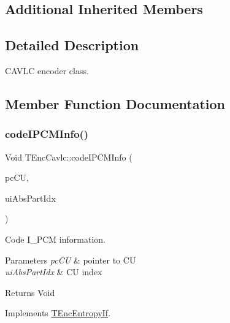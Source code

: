 \subsection*{Additional Inherited Members}


\subsection{Detailed Description}
C\+A\+V\+LC encoder class. 

\subsection{Member Function Documentation}
\mbox{\label{class_t_enc_cavlc_a9e19f3ef8ce0af73f4c0edb681818db0}} 
\subsubsection{\texorpdfstring{code\+I\+P\+C\+M\+Info()}{codeIPCMInfo()}}
{\footnotesize\ttfamily Void T\+Enc\+Cavlc\+::code\+I\+P\+C\+M\+Info (\begin{DoxyParamCaption}\item[{\hyperlink{class_t_com_data_c_u}{T\+Com\+Data\+CU} $\ast$}]{pc\+CU,  }\item[{U\+Int}]{ui\+Abs\+Part\+Idx }\end{DoxyParamCaption})\hspace{0.3cm}{\ttfamily [virtual]}}

Code I\+\_\+\+P\+CM information. 
\begin{DoxyParams}{Parameters}
{\em pc\+CU} & pointer to CU \\
\hline
{\em ui\+Abs\+Part\+Idx} & CU index \\
\hline
\end{DoxyParams}
\begin{DoxyReturn}{Returns}
Void 
\end{DoxyReturn}


Implements \hyperlink{class_t_enc_entropy_if}{T\+Enc\+Entropy\+If}.

\mbox{\label{class_t_enc_cavlc_a72309819d1c1849899f93a0af93f9706}} 

